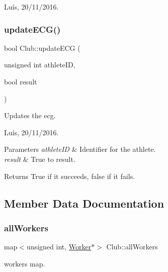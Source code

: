 Luís, 20/11/2016. \hypertarget{class_club_a0903daff929fe8647a7a5e97e789c748}{}\label{class_club_a0903daff929fe8647a7a5e97e789c748} 
\subsubsection{\texorpdfstring{update\+E\+C\+G()}{updateECG()}}
{\footnotesize\ttfamily bool Club\+::update\+E\+CG (\begin{DoxyParamCaption}\item[{unsigned int}]{athlete\+ID,  }\item[{bool}]{result }\end{DoxyParamCaption})}



Updates the ecg. 

Luís, 20/11/2016. 


\begin{DoxyParams}{Parameters}
{\em athlete\+ID} & Identifier for the athlete. \\
\hline
{\em result} & True to result. \\
\hline
\end{DoxyParams}


\begin{DoxyReturn}{Returns}
True if it succeeds, false if it fails. 
\end{DoxyReturn}


\subsection{Member Data Documentation}
\hypertarget{class_club_acbdc0f19e2a14b6e3fe79c92081a0b6e}{}\label{class_club_acbdc0f19e2a14b6e3fe79c92081a0b6e} 
\subsubsection{\texorpdfstring{all\+Workers}{allWorkers}}
{\footnotesize\ttfamily map$<$unsigned int, \hyperlink{class_worker}{Worker}$\ast$$>$ Club\+::all\+Workers\hspace{0.3cm}{\ttfamily [private]}}



workers\textquotesingle{} map. 

\hypertarget{class_club_acd01c6183dc0747ad3c3ab8167bd860e}{}\label{class_club_acd01c6183dc0747ad3c3ab8167bd860e} 
